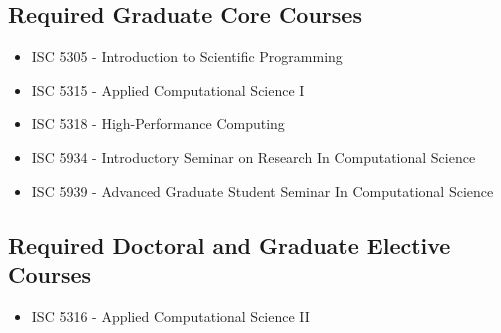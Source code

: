 \documentclass[12pt,a4paper]{article}
\begin{document}
\subsection*{Required Graduate Core Courses}
\begin{itemize}
    \item ISC 5305 - Introduction to Scientific Programming
    \item ISC 5315 - Applied Computational Science I
    \item ISC 5318 - High-Performance Computing
    \item ISC 5934 - Introductory Seminar on Research In Computational Science
    \item ISC 5939 - Advanced Graduate Student Seminar In Computational Science
\end{itemize}

\subsection*{Required Doctoral and Graduate Elective Courses}
\begin{itemize}
    \item ISC 5316 - Applied Computational Science II
\end{itemize}
\end{document}
